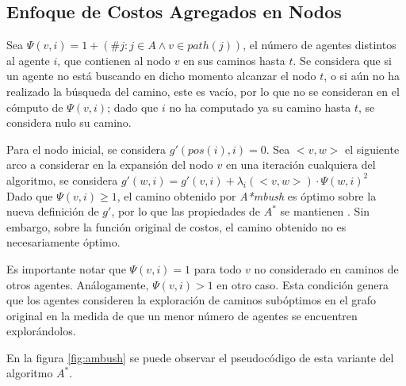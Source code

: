 \documentclass{egpubl}
\begin{document}
\subsection{Enfoque de Costos Agregados en Nodos}

Sea $\Psi(v,i) = 1+(\# j : j \in A \wedge v \in path(j))$,
el número de agentes distintos al agente $i$, que contienen al
nodo $v$ en sus caminos hasta $t$. Se considera que si un agente
no está buscando en dicho momento alcanzar el nodo $t$, o si
aún no ha realizado la búsqueda del camino, este es vacío, por
lo que no se consideran en el cómputo de $\Psi(v,i)$; dado
que $i$ no ha computado ya su camino hasta $t$, se considera
nulo su camino.

Para el nodo inicial, se considera $g'(pos(i),i) = 0$.
Sea $<v,w>$ el siguiente arco a considerar en la expansión del
nodo $v$ en una iteración cualquiera del algoritmo, se considera
$g'(w, i) = g'(v,i) + \lambda_i(<v,w>) \cdot \Psi(w,i)^2$\\

Dado que $\Psi(v,i) \geq 1$, el camino obtenido por \textit{A*mbush}
es óptimo sobre la nueva definición de $g'$, por lo que las
propiedades de $A^*$ se mantienen \cite{HNR72}. Sin embargo, sobre
la función original de costos, el camino obtenido no es necesariamente
óptimo.

Es importante notar que $\Psi(v,i) = 1$ para todo $v$ no
considerado en caminos de otros agentes. Análogamente,
$\Psi(v,i) > 1$ en otro caso. Esta condición genera que
los agentes consideren la exploración de caminos subóptimos
en el grafo original en la medida de que un menor número
de agentes se encuentren explorándolos.

En la figura \ref{fig:ambush} se puede observar el pseudocódigo
de esta variante del algoritmo $A^*$.
\end{document}
